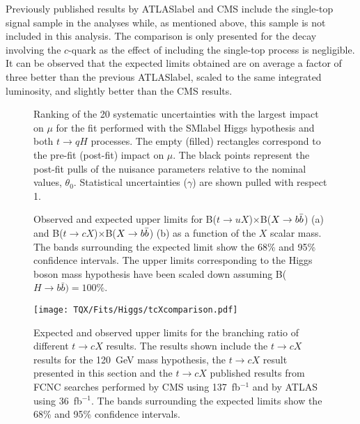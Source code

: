 Previously published results by \acrshort{ATLASlabel} and CMS include the single-top signal sample in the analyses while, as mentioned above, this sample is not included in this analysis. The comparison is only presented for the decay involving the $c$-quark as the effect of including the single-top process is negligible. It can be observed that the expected limits obtained are on average a factor of three better than the previous \acrshort{ATLASlabel}, scaled to the same integrated luminosity, and slightly better than the CMS results.\\

\begin{figure}[htb]
    \RawFloats
    \centering
    \caption{Ranking of the 20 systematic uncertainties with the largest impact on $\mu$ for the fit performed with the \acrshort{SMlabel} Higgs hypothesis and both $t\to qH$ processes. The empty (filled) rectangles correspond  to the pre-fit (post-fit) impact on $\mu$. The black points represent the post-fit pulls of the nuisance parameters relative to the nominal values, $\theta_0$. Statistical uncertainties ($\gamma$) are shown pulled with respect 1.}
    \label{tqX:RankqH}
\end{figure}
\clearpage

\begin{figure}[htb]
    \RawFloats
    \centering
    \caption{Observed and expected upper limits for B($t\to uX$)$\times$B($X\to b\bar{b}$) (a) and B($t\to cX$)$\times$B($X\to b\bar{b}$) (b) as a function of the $X$ scalar mass. The bands surrounding the expected limit show the 68\% and 95\% confidence intervals. The upper limits corresponding to the Higgs boson mass hypothesis have been scaled down assuming B($H \rightarrow b \bar{b}) = 100\%$.}
    \label{tqX:limitIncH}
\end{figure}

\begin{figure}[htb]
    \RawFloats
    \centering
    \texttt{[image: TQX/Fits/Higgs/tcXcomparison.pdf]}
    \caption{Expected and observed upper limits for the branching ratio of different $t\to cX$ results. The results shown include the $t\to cX$ results for the 120~GeV mass hypothesis, the $t\to cX$ result presented in this section and the $t\to cX$ published results from FCNC searches performed by CMS using 137~fb$^{-1}$ and by ATLAS using 36~fb$^{-1}$. The bands surrounding the expected limits show the 68\% and 95\% confidence intervals.}
    \label{tqX:cHlimitcomparison}
\end{figure}

